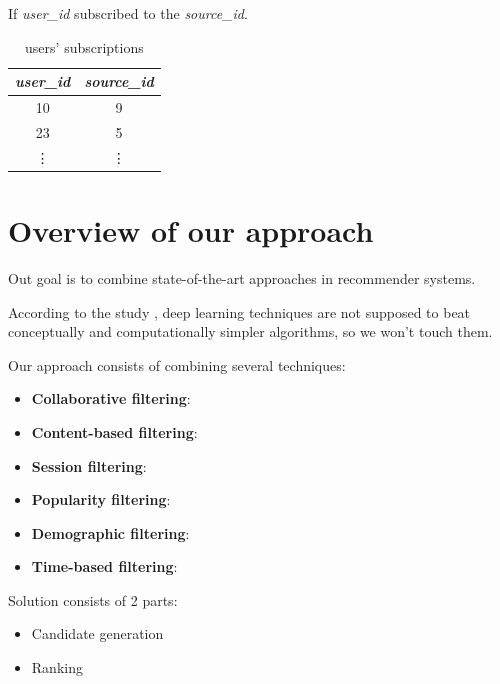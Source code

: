 \documentclass{article}
\begin{document}
    If \emph{user\_id} subscribed to the \emph{source\_id}.

    \begin{table}[h]
        \centering
        \begin{tabular}{cc}
            \toprule

            \emph{user\_id} & \emph{source\_id} \\\midrule

            10 & 9  \\
            23 & 5  \\
            \vdots & \vdots  \\\bottomrule

        \end{tabular}

        \caption{users' subscriptions}
        \label{tab:subscriptions}
    \end{table}




    \section{Overview of our approach}
    \label{sec:overview}

    Out goal is to combine state-of-the-art approaches in recommender systems.

    According to the study \citep{progress}, deep learning techniques are not supposed to beat conceptually and computationally simpler algorithms, so we won't touch them.

    Our approach consists of combining several techniques:

    \begin{itemize}
        \item \textbf{Collaborative filtering}: 
        \item \textbf{Content-based filtering}:
        \item \textbf{Session filtering}:
        \item \textbf{Popularity filtering}:
        \item \textbf{Demographic filtering}:
        \item \textbf{Time-based filtering}:
    \end{itemize}

    Solution consists of 2 parts:


    \begin{itemize}
        \item Candidate generation
        \item Ranking
    \end{itemize}
\end{document}
